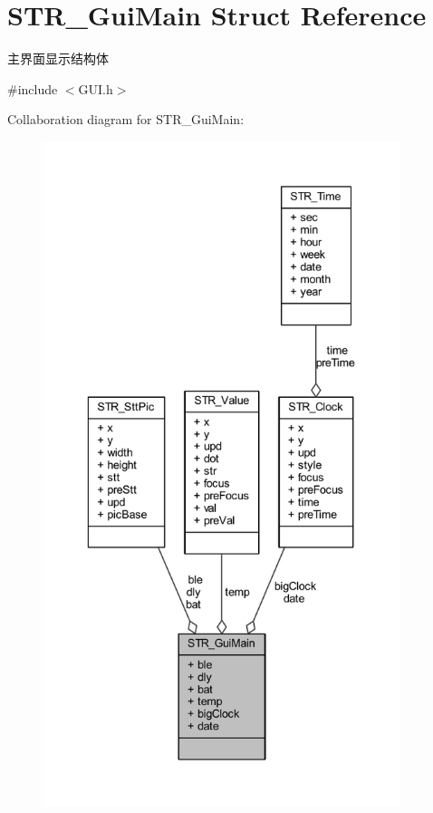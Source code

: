 \hypertarget{struct_s_t_r___gui_main}{\section{\-S\-T\-R\-\_\-\-Gui\-Main \-Struct \-Reference}
\label{struct_s_t_r___gui_main}
}


主界面显示结构体  




{\ttfamily \#include $<$\-G\-U\-I.\-h$>$}



\-Collaboration diagram for \-S\-T\-R\-\_\-\-Gui\-Main\-:\nopagebreak
\begin{figure}[H]
\begin{center}
\leavevmode
\includegraphics[height=550pt]{struct_s_t_r___gui_main__coll__graph}
\end{center}
\end{figure}
